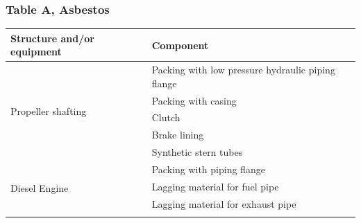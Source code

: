 \documentclass{article}
\begin{document}
\subsubsection{Table A, Asbestos}

\begin{center}
\renewcommand{\arraystretch}{1.4}
\begin{table}[H]
\begin{tabular}{|l|l|}
\hline
\textbf{Structure and/or equipment} & \textbf{Component}                                                                                                                       \\ \hline
\multirow{5}{*}{Propeller shafting} & Packing with low pressure hydraulic piping flange                                                                                        \\ \cline{2-2} 
                                    & Packing with casing                                                                                                                      \\ \cline{2-2} 
                                    & Clutch                                                                                                                                   \\ \cline{2-2} 
                                    & Brake lining                                                                                                                             \\ \cline{2-2} 
                                    & Synthetic stern tubes                                                                                                                    \\ \hline
\multirow{4}{*}{Diesel Engine}      & Packing with piping flange                                                                                                               \\ \cline{2-2} 
                                    & Lagging material for fuel pipe                                                                                                           \\ \cline{2-2} 
                                    & Lagging material for exhaust pipe                                                                                                        \\ \cline{2-2} 

\end{tabular}
\end{table}
\end{center}
\end{document}
